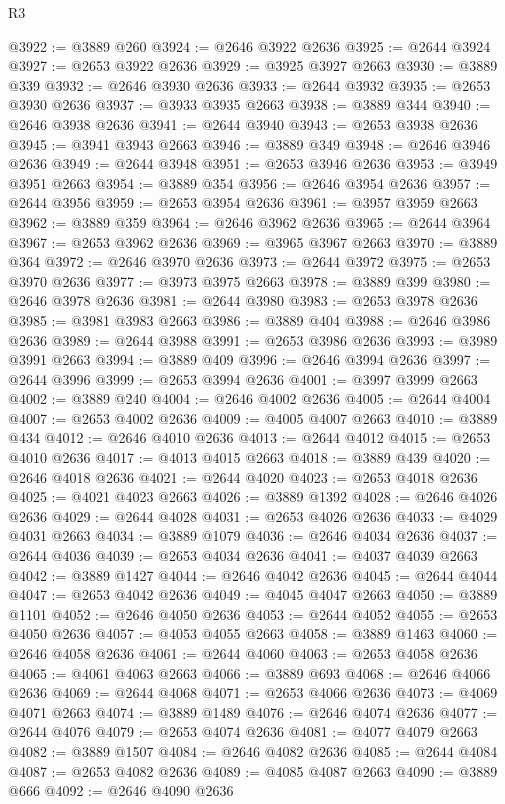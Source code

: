 \begin{lexlean}{R3}
\begin{coremodule}
@3922 := @3889 @260
@3924 := @2646 @3922 @2636
@3925 := @2644 @3924
@3927 := @2653 @3922 @2636
@3929 := @3925 @3927 @2663
@3930 := @3889 @339
@3932 := @2646 @3930 @2636
@3933 := @2644 @3932
@3935 := @2653 @3930 @2636
@3937 := @3933 @3935 @2663
@3938 := @3889 @344
@3940 := @2646 @3938 @2636
@3941 := @2644 @3940
@3943 := @2653 @3938 @2636
@3945 := @3941 @3943 @2663
@3946 := @3889 @349
@3948 := @2646 @3946 @2636
@3949 := @2644 @3948
@3951 := @2653 @3946 @2636
@3953 := @3949 @3951 @2663
@3954 := @3889 @354
@3956 := @2646 @3954 @2636
@3957 := @2644 @3956
@3959 := @2653 @3954 @2636
@3961 := @3957 @3959 @2663
@3962 := @3889 @359
@3964 := @2646 @3962 @2636
@3965 := @2644 @3964
@3967 := @2653 @3962 @2636
@3969 := @3965 @3967 @2663
@3970 := @3889 @364
@3972 := @2646 @3970 @2636
@3973 := @2644 @3972
@3975 := @2653 @3970 @2636
@3977 := @3973 @3975 @2663
@3978 := @3889 @399
@3980 := @2646 @3978 @2636
@3981 := @2644 @3980
@3983 := @2653 @3978 @2636
@3985 := @3981 @3983 @2663
@3986 := @3889 @404
@3988 := @2646 @3986 @2636
@3989 := @2644 @3988
@3991 := @2653 @3986 @2636
@3993 := @3989 @3991 @2663
@3994 := @3889 @409
@3996 := @2646 @3994 @2636
@3997 := @2644 @3996
@3999 := @2653 @3994 @2636
@4001 := @3997 @3999 @2663
@4002 := @3889 @240
@4004 := @2646 @4002 @2636
@4005 := @2644 @4004
@4007 := @2653 @4002 @2636
@4009 := @4005 @4007 @2663
@4010 := @3889 @434
@4012 := @2646 @4010 @2636
@4013 := @2644 @4012
@4015 := @2653 @4010 @2636
@4017 := @4013 @4015 @2663
@4018 := @3889 @439
@4020 := @2646 @4018 @2636
@4021 := @2644 @4020
@4023 := @2653 @4018 @2636
@4025 := @4021 @4023 @2663
@4026 := @3889 @1392
@4028 := @2646 @4026 @2636
@4029 := @2644 @4028
@4031 := @2653 @4026 @2636
@4033 := @4029 @4031 @2663
@4034 := @3889 @1079
@4036 := @2646 @4034 @2636
@4037 := @2644 @4036
@4039 := @2653 @4034 @2636
@4041 := @4037 @4039 @2663
@4042 := @3889 @1427
@4044 := @2646 @4042 @2636
@4045 := @2644 @4044
@4047 := @2653 @4042 @2636
@4049 := @4045 @4047 @2663
@4050 := @3889 @1101
@4052 := @2646 @4050 @2636
@4053 := @2644 @4052
@4055 := @2653 @4050 @2636
@4057 := @4053 @4055 @2663
@4058 := @3889 @1463
@4060 := @2646 @4058 @2636
@4061 := @2644 @4060
@4063 := @2653 @4058 @2636
@4065 := @4061 @4063 @2663
@4066 := @3889 @693
@4068 := @2646 @4066 @2636
@4069 := @2644 @4068
@4071 := @2653 @4066 @2636
@4073 := @4069 @4071 @2663
@4074 := @3889 @1489
@4076 := @2646 @4074 @2636
@4077 := @2644 @4076
@4079 := @2653 @4074 @2636
@4081 := @4077 @4079 @2663
@4082 := @3889 @1507
@4084 := @2646 @4082 @2636
@4085 := @2644 @4084
@4087 := @2653 @4082 @2636
@4089 := @4085 @4087 @2663
@4090 := @3889 @666
@4092 := @2646 @4090 @2636

\end{coremodule}
\end{lexlean}
